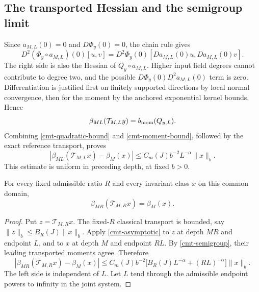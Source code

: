 \subsection{The transported Hessian and the semigroup limit}
\label{cmt-preservation-section}

Since \(a_{M,L}(0)=0\) and \(D\Phi_y(0)=0\), the chain rule gives
\begin{equation}
 D^2(\Phi_y\circ a_{M,L})(0)[u,v]
   =D^2\Phi_y(0)[Da_{M,L}(0)u,Da_{M,L}(0)v].
 \label{cmt-chain-rule}
\end{equation}
The right side is also the Hessian of
\(Q_y\circ a_{M,L}\). Higher input field degrees cannot
contribute to degree two, and the possible
\(D\Phi_y(0)D^2a_{M,L}(0)\) term is zero.
Differentiation is justified first on finitely supported
directions by local normal convergence, then for the moment
by the anchored exponential kernel bounds. Hence
\begin{equation}
 \beta_{ML}(\mathcal T_{M,L}y)=b_{\rm mom}(Q_{y,L}).
 \label{cmt-hessian-identification}
\end{equation}
Combining \eqref{cmt-quadratic-bound} and
\eqref{cmt-moment-bound}, followed by the exact reference
transport, proves
\begin{equation}
 |\beta_{ML}(\mathcal T_{M,L}x)-\beta_M(x)|
       \le C_m(J)b^{-2}L^{-\alpha}\|x\|_b.
 \label{cmt-asymptotic}
\end{equation}
This estimate is uniform in preceding depth, at fixed \(b>0\).

\begin{theorem}
\label{cmt-theorem}
For every fixed admissible ratio \(R\) and every invariant
class \(x\) on this common domain,
\begin{equation}
       \beta_{MR}(\mathcal T_{M,R}x)=\beta_M(x).
 \label{cmt-exact}
\end{equation}
\end{theorem}
\begin{proof}
Put \(z=\mathcal T_{M,R}x\). The fixed-\(R\) classical
transport is bounded, say
\(\|z\|_b\le B_R(J)\|x\|_b\). Apply
\eqref{cmt-asymptotic} to \(z\) at depth \(MR\) and
endpoint \(L\), and to \(x\) at depth \(M\) and endpoint
\(RL\). By \eqref{cmt-semigroup}, their leading transported
moments agree. Therefore
\begin{equation}
 |\beta_{MR}(\mathcal T_{M,R}x)-\beta_M(x)|
 \le C_m(J)b^{-2}
       \bigl[B_R(J)L^{-\alpha}+(RL)^{-\alpha}\bigr]\|x\|_b.
 \label{cmt-comparison}
\end{equation}
The left side is independent of \(L\). Let \(L\) tend through
the admissible endpoint powers to infinity in the joint
system.
\end{proof}

